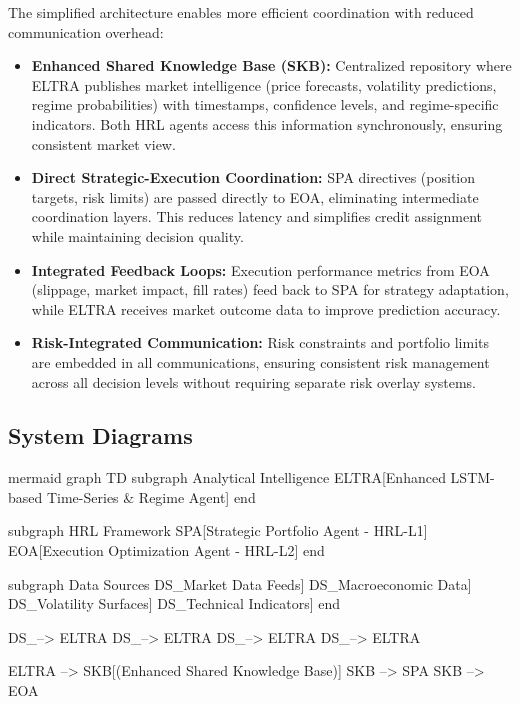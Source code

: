 \documentclass[11pt]{article}
\begin{document}
The simplified architecture enables more efficient coordination with reduced communication overhead:

\begin{itemize}
\item   \textbf{Enhanced Shared Knowledge Base (SKB):} Centralized repository where ELTRA publishes market intelligence (price forecasts, volatility predictions, regime probabilities) with timestamps, confidence levels, and regime-specific indicators. Both HRL agents access this information synchronously, ensuring consistent market view.
\item   \textbf{Direct Strategic-Execution Coordination:} SPA directives (position targets, risk limits) are passed directly to EOA, eliminating intermediate coordination layers. This reduces latency and simplifies credit assignment while maintaining decision quality.
\item   \textbf{Integrated Feedback Loops:} Execution performance metrics from EOA (slippage, market impact, fill rates) feed back to SPA for strategy adaptation, while ELTRA receives market outcome data to improve prediction accuracy.
\item   \textbf{Risk-Integrated Communication:} Risk constraints and portfolio limits are embedded in all communications, ensuring consistent risk management across all decision levels without requiring separate risk overlay systems.

\end{itemize}
\subsection{System Diagrams}

mermaid
graph TD
    subgraph Analytical Intelligence
        ELTRA[Enhanced LSTM-based Time-Series \& Regime Agent]
    end

    subgraph HRL Framework
        SPA[Strategic Portfolio Agent - HRL-L1]
        EOA[Execution Optimization Agent - HRL-L2]
    end

    subgraph Data Sources
        DS\_{\text{\1}}\2Market Data Feeds]
        DS\_{\text{\1}}\2Macroeconomic Data]
        DS\_{\text{\1}}\2Volatility Surfaces]
        DS\_{\text{\1}}\2Technical Indicators]
    end

    DS\_{\text{\1}}\2--> ELTRA
    DS\_{\text{\1}}\2--> ELTRA
    DS\_{\text{\1}}\2--> ELTRA
    DS\_{\text{\1}}\2--> ELTRA

    ELTRA --> SKB[(Enhanced Shared Knowledge Base)]
    SKB --> SPA
    SKB --> EOA
    
\end{document}
